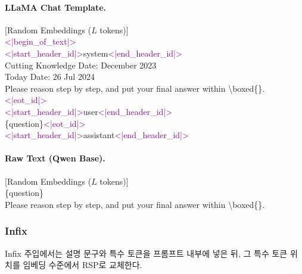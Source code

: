 \paragraph{LLaMA Chat Template.}
\begin{tcolorbox}[colback=gray!5, colframe=black!60, arc=3pt, boxrule=0.5pt, fontupper=\footnotesize\ttfamily, breakable]
\textcolor{blue!70!black}{[Random Embeddings ($L$ tokens)]}\\
\textcolor{purple}{<|begin\_of\_text|>}\\
\textcolor{purple}{<|start\_header\_id|>}system\textcolor{purple}{<|end\_header\_id|>}\\
Cutting Knowledge Date: December 2023\\
Today Date: 26 Jul 2024\\
Please reason step by step, and put your final answer within \textbackslash boxed\{\}.\textcolor{purple}{<|eot\_id|>}\\
\textcolor{purple}{<|start\_header\_id|>}user\textcolor{purple}{<|end\_header\_id|>}\\
\{question\}\textcolor{purple}{<|eot\_id|>}\\
\textcolor{purple}{<|start\_header\_id|>}assistant\textcolor{purple}{<|end\_header\_id|>}
\end{tcolorbox}

\paragraph{Raw Text (Qwen Base).}
\begin{tcolorbox}[colback=gray!5, colframe=black!60, arc=3pt, boxrule=0.5pt, fontupper=\footnotesize\ttfamily, breakable]
\textcolor{blue!70!black}{[Random Embeddings ($L$ tokens)]}\\
\{question\}\\
Please reason step by step, and put your final answer within \textbackslash boxed\{\}.
\end{tcolorbox}

\subsubsection{Infix}

Infix 주입에서는 설명 문구와 특수 토큰을 프롬프트 내부에 넣은 뒤, 그 특수 토큰 위치를 임베딩 수준에서 RSP로 교체한다.

